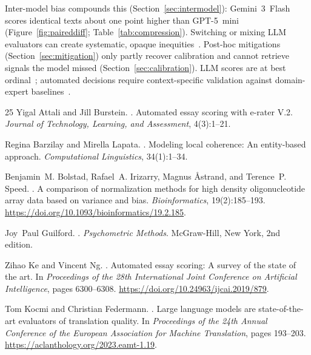 \documentclass[11pt]{article}
\begin{document}
Inter-model bias compounds this (Section~\ref{sec:intermodel}):
Gemini~3~Flash scores identical texts about one point higher than
GPT-5~mini (Figure~\ref{fig:paireddiff}; Table~\ref{tab:compression}).
Switching or mixing LLM evaluators can create systematic, opaque
inequities~\citep{guilford1954psychometric}. Post-hoc mitigations
(Section~\ref{sec:mitigation}) only partly recover calibration and cannot
retrieve signals the model missed (Section~\ref{sec:calibration}). LLM
scores are at best ordinal~\citep{stevens1971issues}; automated decisions
require context-specific validation against domain-expert baselines~\citep{ke2019automated}.

\begin{thebibliography}{25}
Yigal Attali and Jill Burstein.
.
\newblock Automated essay scoring with {e-rater}{\textregistered} {V.2}.
\newblock \emph{Journal of Technology, Learning, and Assessment}, 4(3):1--21.

Regina Barzilay and Mirella Lapata.
.
\newblock Modeling local coherence: An entity-based approach.
\newblock \emph{Computational Linguistics}, 34(1):1--34.

Benjamin~M. Bolstad, Rafael~A. Irizarry, Magnus {\AA}strand, and
Terence~P. Speed.
.
\newblock A comparison of normalization methods for high density
oligonucleotide array data based on variance and bias.
\newblock \emph{Bioinformatics}, 19(2):185--193.
\newblock \url{https://doi.org/10.1093/bioinformatics/19.2.185}.

Joy~Paul Guilford.
.
\newblock \emph{Psychometric Methods}.
\newblock McGraw-Hill, New York, 2nd edition.

Zihao Ke and Vincent Ng.
.
\newblock Automated essay scoring: A survey of the state of the art.
\newblock In \emph{Proceedings of the 28th International Joint Conference
on Artificial Intelligence}, pages 6300--6308.
\newblock \url{https://doi.org/10.24963/ijcai.2019/879}.

Tom Kocmi and Christian Federmann.
.
\newblock Large language models are state-of-the-art evaluators of
translation quality.
\newblock In \emph{Proceedings of the 24th Annual Conference of the
European Association for Machine Translation}, pages 193--203.
\newblock \url{https://aclanthology.org/2023.eamt-1.19}.


\end{thebibliography}
\end{document}
